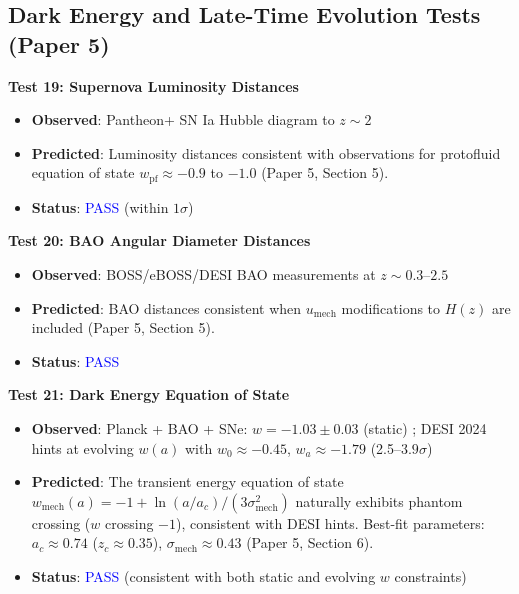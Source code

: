 \documentclass[11pt,a4paper]{article}
\newcommand{\umech}{\ensuremath{u_{\mathrm{mech}}}}
\newcommand{\wmech}{\ensuremath{w_{\mathrm{mech}}}}
\theoremstyle{definition}
\theoremstyle{remark}
\begin{document}
\subsection{Dark Energy and Late-Time Evolution Tests (Paper 5)}
\label{sec:tests_dark_energy}

\textbf{Test 19: Supernova Luminosity Distances}

\begin{itemize}[leftmargin=*, itemsep=0.1em]
\item \textbf{Observed}: Pantheon+ SN Ia Hubble diagram to $z \sim 2$ \cite{Scolnic2018}
\item \textbf{Predicted}: Luminosity distances consistent with observations for protofluid equation of state $w_{\mathrm{pf}} \approx -0.9$ to $-1.0$ (Paper 5, Section 5).
\item \textbf{Status}: \textcolor{blue}{PASS} (within $1\sigma$)
\end{itemize}

\textbf{Test 20: BAO Angular Diameter Distances}

\begin{itemize}[leftmargin=*, itemsep=0.1em]
\item \textbf{Observed}: BOSS/eBOSS/DESI BAO measurements at $z \sim 0.3$--$2.5$
\item \textbf{Predicted}: BAO distances consistent when $\umech$ modifications to $H(z)$ are included (Paper 5, Section 5).
\item \textbf{Status}: \textcolor{blue}{PASS}
\end{itemize}

\textbf{Test 21: Dark Energy Equation of State}

\begin{itemize}[leftmargin=*, itemsep=0.1em]
\item \textbf{Observed}: Planck + BAO + SNe: $w = -1.03 \pm 0.03$ (static) \cite{Planck2018}; DESI 2024 \cite{DESI2024} hints at evolving $w(a)$ with $w_0 \approx -0.45$, $w_a \approx -1.79$ (2.5--$3.9\sigma$)
\item \textbf{Predicted}: The transient energy equation of state $\wmech(a) = -1 + \ln(a/a_c)/(3\sigma_{\mathrm{mech}}^2)$ naturally exhibits phantom crossing ($w$ crossing $-1$), consistent with DESI hints. Best-fit parameters: $a_c \approx 0.74$ ($z_c \approx 0.35$), $\sigma_{\mathrm{mech}} \approx 0.43$ (Paper 5, Section 6).
\item \textbf{Status}: \textcolor{blue}{PASS} (consistent with both static and evolving $w$ constraints)
\end{itemize}
\end{document}
